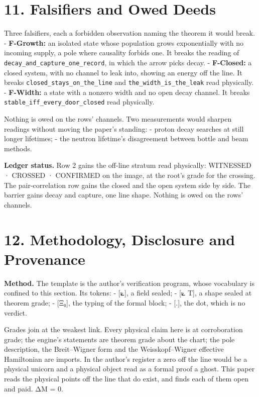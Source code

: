 \documentclass[10pt]{article}
\begin{document}
\hypertarget{falsifiers-and-owed-deeds}{%
\section{11. Falsifiers and Owed
Deeds}\label{falsifiers-and-owed-deeds}}

Three falsifiers, each a forbidden observation naming the theorem it
would break. - \textbf{F-Growth:} an isolated state whose population
grows exponentially with no incoming supply, a pole where causality
forbids one. It breaks the reading of
\texttt{decay\_and\_capture\_one\_record}, in which the arrow picks
decay. - \textbf{F-Closed:} a closed system, with no channel to leak
into, showing an energy off the line. It breaks
\texttt{closed\_stays\_on\_the\_line} and
\texttt{the\_width\_is\_the\_leak} read physically. - \textbf{F-Width:}
a state with a nonzero width and no open decay channel. It breaks
\texttt{stable\_iff\_every\_door\_closed} read physically.

Nothing is owed on the rows' channels. Two measurements would sharpen
readings without moving the paper's standing: - proton decay searches at
still longer lifetimes; - the neutron lifetime's disagreement between
bottle and beam methods.

\textbf{Ledger status.} Row 2 gains the off-line stratum read
physically: WITNESSED · CROSSED · CONFIRMED on the image, at the root's
grade for the crossing. The pair-correlation row gains the closed and
the open system side by side. The barrier gains decay and capture, one
line shape. Nothing is owed on the rows' channels.

\hypertarget{methodology-disclosure-and-provenance}{%
\section{12. Methodology, Disclosure and
Provenance}\label{methodology-disclosure-and-provenance}}

\textbf{Method.} The template is the author's verification program,
whose vocabulary is confined to this section. Its tokens: - {[}⟀{]}, a
field sealed; - {[}⟀ T{]}, a shape sealed at theorem grade; - {[}Ξ₀{]},
the typing of the formal block; - {[}.{]}, the dot, which is no verdict.

Grades join at the weakest link. Every physical claim here is at
corroboration grade; the engine's statements are theorem grade about the
chart; the pole description, the Breit--Wigner form and the
Weisskopf--Wigner effective Hamiltonian are imports. In the author's
register a zero off the line would be a physical unicorn and a physical
object read as a formal proof a ghost. This paper reads the physical
points off the line that do exist, and finds each of them open and paid.
ΔM = 0.
\end{document}
